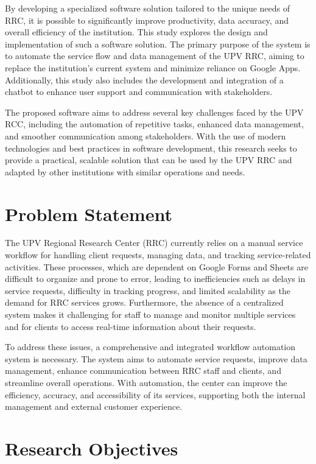 By developing a specialized software solution tailored to the unique needs of RRC, it is possible to significantly improve productivity, data accuracy, and overall efficiency of the institution. This study explores the design and implementation of such a software solution. The primary purpose of the system is to automate the service flow and data management of the UPV RRC, aiming to replace the institution's current system and minimize reliance on Google Apps. Additionally, this study also includes the development and integration of a chatbot to enhance user support and communication with stakeholders.

The proposed software aims to address several key challenges faced by the UPV RCC, including the automation of repetitive tasks, enhanced data management, and smoother communication among stakeholders. With the use of modern technologies and best practices in software development, this research seeks to provide a practical, scalable solution that can be used by the UPV RRC and adapted by other institutions with similar operations and needs.

\section{Problem Statement}

The UPV Regional Research Center (RRC) currently relies on a manual service workflow for handling client requests, managing data, and tracking service-related activities. These processes, which are dependent on Google Forms and Sheets are difficult to organize and prone to error, leading to inefficiencies such as delays in service requests, difficulty in tracking progress, and limited scalability as the demand for RRC services grows. Furthermore, the absence of a centralized system makes it challenging for staff to manage and monitor multiple services and for clients to access real-time information about their requests.

To address these issues, a comprehensive and integrated workflow automation system is necessary. The system aims to automate service requests, improve data management, enhance communication between RRC staff and clients, and streamline overall operations. With automation, the center can improve the efficiency, accuracy, and accessibility of its services, supporting both the internal management and external customer experience.

\section{Research Objectives}
\label{sec:researchobjectives}

